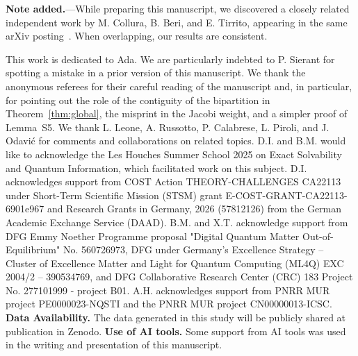 \documentclass[aps,prl,twocolumn,superscriptaddress,reprint,longbibliography,nofootinbib]{revtex4-2}
\begin{document}
\textbf{Note added.}---While preparing this manuscript, we discovered a closely related independent work by M. Collura, B. Beri, and E. Tirrito, appearing in the same arXiv posting~\cite{collura2026nonlocalnonstabilizernessfreefermion}.
When overlapping, our results are consistent.

\begin{acknowledgments}
This work is dedicated to Ada. We are particularly indebted to P. Sierant for spotting a mistake in a prior version of this manuscript. We thank the anonymous referees for their careful reading of the manuscript and, in particular, for pointing out the role of the contiguity of the bipartition in Theorem~\ref{thm:global}, the misprint in the Jacobi weight, and a simpler proof of Lemma~S5.
We thank L. Leone, A. Russotto, P. Calabrese, L. Piroli, and J. Odavi\'c for comments and collaborations on related topics.
D.I. and B.M. would like to acknowledge the Les Houches Summer School 2025 on Exact Solvability and Quantum Information, which facilitated work on this subject.
D.I. acknowledges support from COST Action THEORY-CHALLENGES CA22113 under Short-Term Scientific Mission (STSM) grant E-COST-GRANT-CA22113-6901e967 and Research Grants in Germany, 2026 (57812126) from the German Academic Exchange Service (DAAD).
B.M. and X.T. acknowledge support from DFG Emmy Noether Programme proposal "Digital Quantum Matter Out-of-Equilibrium" No. 560726973, DFG under Germany's Excellence Strategy – Cluster of Excellence Matter and Light for Quantum Computing (ML4Q) EXC 2004/2 – 390534769, and DFG Collaborative Research Center (CRC) 183 Project No. 277101999 - project B01.
A.H. acknowledges support from  PNRR MUR project PE0000023-NQSTI and the PNRR MUR project CN00000013-ICSC.
\textbf{Data Availability.} The data generated in this study will be publicly shared at publication in Zenodo.
\textbf{Use of AI tools.} Some support from AI tools was used in the writing and presentation of this manuscript.
\end{acknowledgments}

\nocite{Bapat1989,HornJohnson2012,Hough2006,MR38136,bhatia2013matrix,sfeo}



\end{document}
